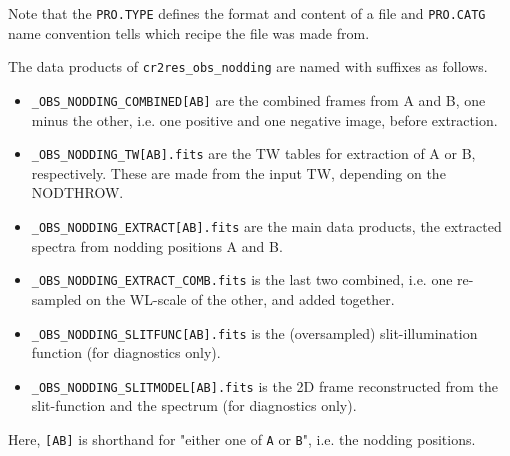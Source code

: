Note that the \verb'PRO.TYPE' defines the format and content of a file and \verb'PRO.CATG' name convention tells which recipe the file was made from.


The data products of \texttt{cr2res\_obs\_nodding} are named with suffixes as follows.
\begin{itemize}
    \item \verb!_OBS_NODDING_COMBINED[AB]! are the combined frames from A and B, one minus the other, i.e. one positive and one negative image, before extraction.
    \item \verb!_OBS_NODDING_TW[AB].fits! are the TW tables for extraction of A or B, respectively. These are made from the input TW, depending on the NODTHROW.
    \item \verb!_OBS_NODDING_EXTRACT[AB].fits! are the main data products, the extracted spectra from nodding positions A and B.
    \item \verb!_OBS_NODDING_EXTRACT_COMB.fits! is the last two combined, i.e. one re-sampled on the WL-scale of the other, and added together.
    \item \verb!_OBS_NODDING_SLITFUNC[AB].fits! is the (oversampled) slit-illumination function (for diagnostics only).
    \item \verb!_OBS_NODDING_SLITMODEL[AB].fits! is the 2D frame reconstructed from the slit-function and the spectrum (for diagnostics only).

\end{itemize}

Here, \verb![AB]! is shorthand for "either one of \verb!A! or \verb!B!", i.e.
the nodding positions.